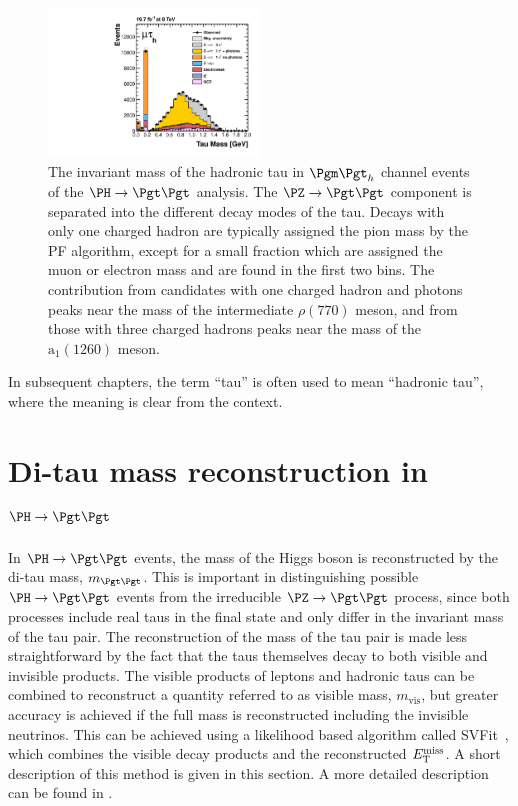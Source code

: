 \begin{figure}[htb]
\begin{center}
    \includegraphics[width=0.5\textwidth]
      {plots/reco/m_2_tau_modes_mt_2012.pdf}
\end{center}
\caption[The invariant mass of the hadronic tau in $\mutau$ channel events of
the $\PH\to\Pgt\Pgt$ analysis.]{The invariant mass of the hadronic tau in $\mutau$ channel events of
the $\PH\to\Pgt\Pgt$ analysis. The $\PZ\to\Pgt\Pgt$ component is separated into the
different decay modes of the tau. Decays with only one charged hadron are
typically assigned the pion mass by the \ac{PF} algorithm, except for a small
fraction which are assigned the muon or electron mass and are found in the first
two bins. The contribution from candidates with one charged hadron and photons
peaks near the mass of the intermediate $\rho(770)$ meson, and from those with
three charged hadrons peaks near the mass of the $\text{a}_{1}(1260)$ meson.}
\label{fig:taumass}
\end{figure}

In subsequent chapters, the term ``tau'' is often used to mean ``hadronic tau'',
where the meaning is clear from the context.

\section{Di-tau mass reconstruction in $\PH \to \Pgt\Pgt$}
\label{sec:svfit}

In $\PH \to \Pgt\Pgt$ events, the mass of the Higgs boson is reconstructed by
the di-tau mass, $m_{\Pgt\Pgt}$. This is important in distinguishing possible $\PH\to\Pgt\Pgt$
events from the irreducible $\PZ \to \Pgt\Pgt$ process, since both processes
include real taus in the final state and only differ in the invariant mass of the tau pair. 
The reconstruction of the mass of the tau pair is made less straightforward
by the fact that the taus themselves decay to both visible and invisible
products. The visible products of leptons and hadronic taus can be combined to
reconstruct a quantity referred to as visible mass, $m_{\text{vis}}$,
but greater accuracy is achieved if the full mass is reconstructed including the
invisible neutrinos. This can be achieved using a likelihood based algorithm called
SVFit~\cite{HIG-13-004}, which combines the visible decay products and the reconstructed $E_{\mathrm{T}}^{\text{miss}}$. A
short description of this method is given in this section. A more detailed
description can be found in \cite{HIG-13-004,Bianchini:2014vza}.

